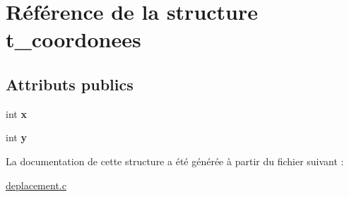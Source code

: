 \hypertarget{structt__coordonees}{\section{Référence de la structure t\-\_\-coordonees}
\label{structt__coordonees}
}
\subsection*{Attributs publics}
\begin{DoxyCompactItemize}
\item 
\hypertarget{structt__coordonees_af50513442c4cb756f5b15d4c23dc47c9}{int {\bfseries x}}\label{structt__coordonees_af50513442c4cb756f5b15d4c23dc47c9}

\item 
\hypertarget{structt__coordonees_a5d637c9bbed637ce50c9b5613a4ec1e2}{int {\bfseries y}}\label{structt__coordonees_a5d637c9bbed637ce50c9b5613a4ec1e2}

\end{DoxyCompactItemize}


La documentation de cette structure a été générée à partir du fichier suivant \-:\begin{DoxyCompactItemize}
\item 
\hyperlink{deplacement_8c}{deplacement.\-c}\end{DoxyCompactItemize}
